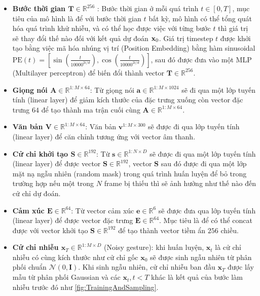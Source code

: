 \begin{itemize}
	\item \textbf{Bước thời gian $\mathbf{T} \in \mathbb{R}^{256}$ }: Bước thời gian ở mỗi quá trình $t \in [0, T]$, mục tiêu của mô hình là để với bước thời gian $t$ bất kỳ, mô hình có thể tổng quát hóa quá trình khử nhiễu, và có thể học được việc với từng bước $t$ thì giá trị sẽ thay đổi thế nào đối với kết quả dự đoán $\mathbf{x}_0$. Giá trị timestep $t$ được khởi tạo bằng việc mã hóa nhúng vị trí (Position Embedding) bằng hàm sinusoidal $\text{PE}(t) = \left[ \sin{\left(\frac{t}{10000^{2i / d}}\right)}, \cos{\left(\frac{t}{10000^{2i / d}}\right)} \right]$, sau đó được đưa vào một MLP (Multilayer perceptron) để biến đổi thành vector $\mathbf{T}  \in \mathbb{R}^{256}$.
	
	  \item \textbf{Giọng nói $\mathbf{A} \in \mathbb{R}^{1:M \times 64}$}: Từ giọng nói $\mathbf{a} \in \mathbb{R}^{1:M \times 1024}$ sẽ đi qua một lớp tuyến tính (linear layer) để giảm kích thước của đặc trưng xuống còn vector đặc trưng $64$ để tạo thành ma trận cuối cùng $\mathbf{A} \in \mathbb{R}^{1:M \times 64}$.
	  
	  \item \textbf{Văn bản $\mathbf{V} \in \mathbb{R}^{1:M \times 64}$}: Văn bản $\mathbf{v}^{1:M \times 300}$ sẽ được đi qua lớp tuyến tính (linear layer) để căn chỉnh tương ứng với vector âm thanh.
	
	\item \textbf{Cử chỉ khởi tạo $\mathbf{S} \in \mathbb{R}^{192}$}: Từ $\mathbf{s} \in \mathbb{R}^{1:N \times D}$ sẽ được đi qua một lớp tuyến tính (linear layer) để được vector $\mathbf{S} \in \mathbb{R}^{192}$, vector $\mathbf{S}$ sau đó được đi qua một lớp mặt nạ ngẫu nhiên (random mask) trong quá trình huấn luyện để bỏ trong trường hợp nếu một trong $N$ frame bị thiếu thì sẽ ảnh hưởng như thế nào đến cử chỉ dự đoán.

  \item \textbf{Cảm xúc $\mathbf{E} \in \mathbb{R}^{64}$}: Từ vector cảm xúc $\mathbf{e} \in \mathbb{R}^{6}$ sẽ được đưa qua lớp tuyến tính (linear layer) để được vector đặc trưng $\mathbf{E} \in \mathbb{R}^{64}$. Mục tiêu là để có thể concat được với vector khởi tạo $\mathbf{S} \in \mathbb{R}^{192} $ để tạo thành vector tiềm ẩn $256$ chiều.
  
	\item \textbf{Cử chỉ nhiễu $\mathbf{x}_{T} \in \mathbb{R}^{1:M \times D}$} (Noisy gesture): khi huấn luyện, $\mathbf{x}_{t}$ là cử chỉ nhiễu có cùng kích thước như cử chỉ gốc $\mathbf{x}_{0}$ sẽ được sinh ngẫu nhiên từ phân phối chuẩn $\mathcal{N}(0, \mathbf{I})$. Khi sinh ngẫu nhiên, cử chỉ nhiễu ban đầu $\mathbf{x}_{T}$ được lấy mẫu từ phân phối Gaussian và các $\mathbf{x}_{t}, t<T$ khác là kết quả của bước làm nhiễu trước đó như \autoref{fig:TrainingAndSampling}.
\end{itemize}


